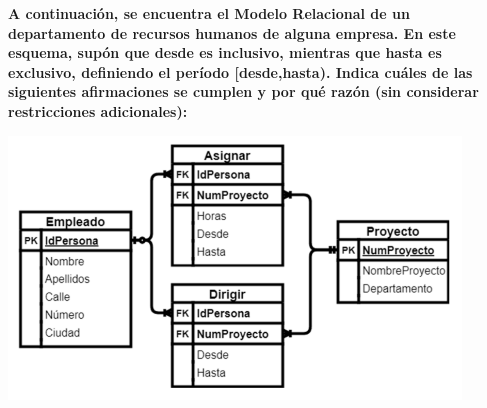 \textbf{A continuación, se encuentra el Modelo Relacional de un departamento de recursos humanos de alguna empresa. En
este esquema, supón que desde es inclusivo, mientras que hasta es exclusivo, definiendo el período [desde,hasta). Indica
cuáles de las siguientes afirmaciones se cumplen y por qué razón (sin considerar restricciones adicionales):}\vspace{.3cm}

\begin{center}
    \includegraphics[width=12cm]{conversion/../resources/4.png}
\end{center}

\vspace{.5cm}
